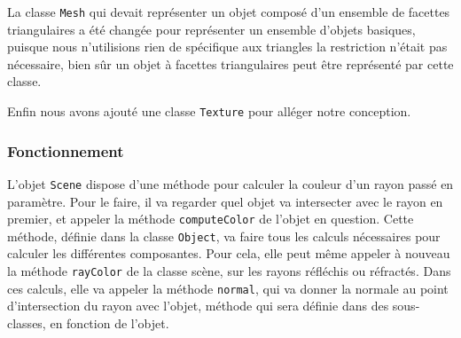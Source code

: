 \documentclass[a4paper]{article}
\begin{document}
      La classe \verb+Mesh+ qui
      devait représenter un objet composé d'un ensemble de facettes
      triangulaires a été changée pour représenter un ensemble d'objets
      basiques, puisque nous n'utilisions rien de spécifique aux triangles la
      restriction n'était pas nécessaire, bien sûr un objet à facettes
      triangulaires peut être représenté par cette classe.
      
      Enfin nous avons ajouté une classe \verb+Texture+ pour alléger notre
      conception.

    \subsubsection{Fonctionnement}
      L'objet \verb+Scene+ dispose d'une méthode pour calculer la couleur
      d'un rayon passé en paramètre.
      Pour le faire, il va regarder quel objet va intersecter avec le rayon en
      premier, et appeler la méthode \verb+computeColor+ de l'objet en question.
      Cette méthode, définie dans la classe \verb+Object+, va faire tous les
      calculs nécessaires pour calculer les différentes composantes. Pour cela,
      elle peut même appeler à nouveau la méthode \verb+rayColor+ de la classe
      scène, sur les rayons réfléchis ou réfractés.
      Dans ces calculs, elle va appeler la méthode \verb+normal+, qui va donner
      la normale au point d'intersection du rayon avec l'objet, méthode qui sera
      définie dans des sous-classes, en fonction de l'objet.
\end{document}
